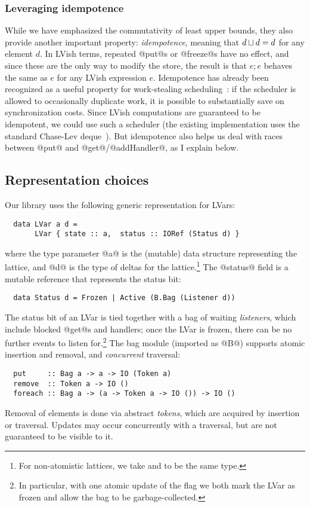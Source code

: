 \subsubsection{Leveraging idempotence}

While we have emphasized the commutativity of least upper bounds, they
also provide another important property: \emph{idempotence}, meaning
that $d \sqcup d = d$ for any element $d$.  In LVish terms,
repeated @put@s or @freeze@s have no effect, and since these are the
only way to modify the store, the result is that $e; e$ behaves the
same as $e$ for any LVish expression $e$.  Idempotence has already
been recognized as a useful property for work-stealing
scheduling~\cite{idempotent}: if the scheduler is allowed to
occasionally duplicate work, it is possible to substantially save on
synchronization costs.  Since LVish computations are guaranteed to be
idempotent, we could use such a scheduler (the existing implementation
uses the standard Chase-Lev deque~\cite{ChaseLev}).  But idempotence
also helps us deal with races between @put@ and @get@/@addHandler@, as
I explain below.

\subsection{Representation choices}
Our library uses the following generic representation for LVars:
\begin{lstlisting}
  data LVar a d = 
       LVar { state :: a,  status :: IORef (Status d) }
\end{lstlisting}
where the type parameter @a@ is the (mutable) data structure representing the
lattice, and @d@ is the type of deltas for the lattice.\footnote{For
  non-atomistic lattices, we take  and  to be the same type.}
The @status@ field is a mutable reference that represents the status bit:
\begin{lstlisting}
  data Status d = Frozen | Active (B.Bag (Listener d))
\end{lstlisting}
The status bit of an LVar is tied together with a bag of waiting
\emph{listeners}, which include blocked @get@s and handlers; once the LVar is
frozen, there can be no further events to listen for.\footnote{In particular,
  with one atomic update of the flag we both mark the LVar as frozen and allow
  the bag to be garbage-collected.}  The bag module (imported as @B@) supports
atomic insertion and removal, and \emph{concurrent} traversal:
\begin{lstlisting}
  put     :: Bag a -> a -> IO (Token a)
  remove  :: Token a -> IO ()
  foreach :: Bag a -> (a -> Token a -> IO ()) -> IO ()
\end{lstlisting}
Removal of elements is done via abstract \emph{tokens}, which are acquired by
insertion or traversal.  Updates may occur concurrently with a traversal, but
are not guaranteed to be visible to it.

